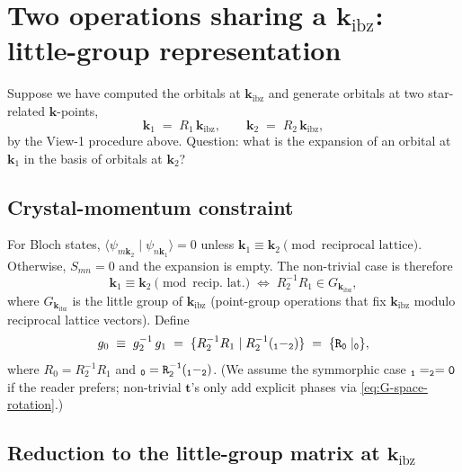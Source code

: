 \documentclass[11pt,a4paper]{article}
\newcommand{\kk}{\mathbf{k}}
\newcommand{\tvec}{\mathbf{t}}
\newcommand{\kibz}{\kk_{\text{ibz}}}
\begin{document}
\section{Two operations sharing a $\kibz$: little-group representation}
\label{sec:multi-symm}

Suppose we have computed the orbitals at $\kibz$ and generate orbitals at two
star-related $\kk$-points,
\begin{equation}
\kk_1 \;=\; R_1\,\kibz, \qquad \kk_2 \;=\; R_2\,\kibz,
\end{equation}
by the View-1 procedure above. Question: what is the expansion of an orbital
at $\kk_1$ in the basis of orbitals at $\kk_2$?

\subsection{Crystal-momentum constraint}

For Bloch states, $\langle\psi_{m\kk_2}\mid\psi_{n\kk_1}\rangle = 0$ unless
$\kk_1 \equiv \kk_2 \pmod{\text{reciprocal lattice}}$. Otherwise, $S_{mn} =
0$ and the expansion is empty. The non-trivial case is therefore
\begin{equation}
\kk_1 \equiv \kk_2 \pmod{\text{recip.~lat.}}
  \;\Longleftrightarrow\;
  R_2^{-1} R_1 \in G_{\kk_{\mathrm{ibz}}},
\end{equation}
where $G_{\kk_{\mathrm{ibz}}}$ is the little group of $\kibz$ (point-group operations that
fix $\kibz$ modulo reciprocal lattice vectors). Define
\begin{equation}
g_0 \;\equiv\; g_2^{-1}\,g_1
   \;=\; \{R_2^{-1}R_1 \mid R_2^{-1}(\tt_1 - \tt_2)\}
   \;=\; \{R_0 \mid \tt_0\},
\end{equation}
where $R_0 = R_2^{-1}R_1$ and $\tt_0 = R_2^{-1}(\tt_1 - \tt_2)$. (We assume
the symmorphic case $\tt_1 = \tt_2 = 0$ if the reader prefers; non-trivial
$\tvec$'s only add explicit phases via \eqref{eq:G-space-rotation}.)

\subsection{Reduction to the little-group matrix at $\kibz$}
\end{document}
